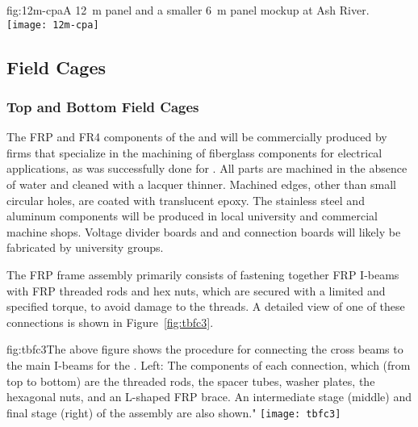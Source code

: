\begin{dunefigure}{fig:12m-cpa}{A \SI{12}{\m}   panel and a smaller \SI{6}{\m}  panel mockup at Ash River.}  %
\texttt{[image: 12m-cpa]}
\end{dunefigure}

\subsection{Field Cages}
\label{sec:fdsp-hv-prod-fc}


\subsubsection{Top and Bottom Field Cages}

The FRP and FR4 components of the   and  will be commercially produced by firms that specialize in the machining of fiberglass components for electrical applications, as was successfully done for . All parts are machined in the absence of water and cleaned with a lacquer thinner. Machined edges, other than small circular holes, are coated with translucent epoxy. The stainless steel and aluminum components will be produced in local university and commercial machine shops. Voltage divider boards and  and  connection boards will likely be fabricated by university groups.

The FRP frame assembly primarily consists of fastening together FRP I-beams with FRP threaded rods and hex nuts, which are secured with a limited and specified torque, to avoid damage to the threads. A detailed view of one of these connections is shown in Figure~\ref{fig:tbfc3}.

\begin{dunefigure}{fig:tbfc3}{The above figure shows the procedure for connecting the cross beams to the main I-beams for the . Left: The components of each connection, which (from top to bottom) are the threaded rods, the spacer tubes, washer plates, the hexagonal nuts, and an L-shaped FRP brace. An intermediate stage (middle) and final stage (right) of the assembly are also shown."}
\texttt{[image: tbfc3]}
\end{dunefigure}

